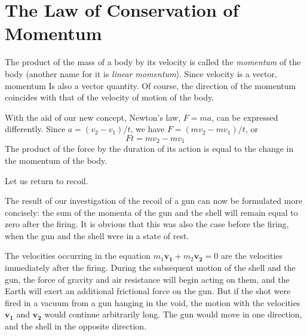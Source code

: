\section{The Law of Conservation of Momentum}

The product of the mass of a body by its velocity is
called the \emph{momentum} of the body (another name for it is
\emph{linear momentum}). Since velocity is a vector, momentum
Is also a vector quantity. Of course, the direction of the
momentum coincides with that of the velocity of motion
of the body.

With the aid of our new concept, Newton's law, $F = ma$, can be expressed differently. Since $a =(v_{2} - v_{1})/t$,
we have $F =(mv_{2} - mv_{1})/t$, or 
\begin{equation*}%
Ft = mv_{2} - mv_{1}
\end{equation*}
The product of the force by the duration of its action is equal
to the change in the momentum of the body.

Let us return to recoil.

The result of our investigation of the recoil of a gun
can now be formulated more concisely: the sum of the
momenta of the gun and the shell will remain equal to
zero after the firing. It is obvious that this was also the
case before the firing, when the gun and the shell were
in a state of rest.

The velocities occurring in the equation $m_{1}\mathbf{v_{1}} +
m_{2}\mathbf{v_{2}} = 0$ are the velocities immediately after the
firing. During the subsequent motion of the shell and
the gun, the force of gravity and air resistance will begin
acting on them, and the Earth will exert an additional
frictional force on the gun. But if the shot were fired in
a vacuum from a gun hanging in the void, the motion
with the velocities $\mathbf{v_{1}}$ and $\mathbf{v_{2}}$ would continue arbitrarily long. The gun would move in one direction, and the shell in the opposite direction.

